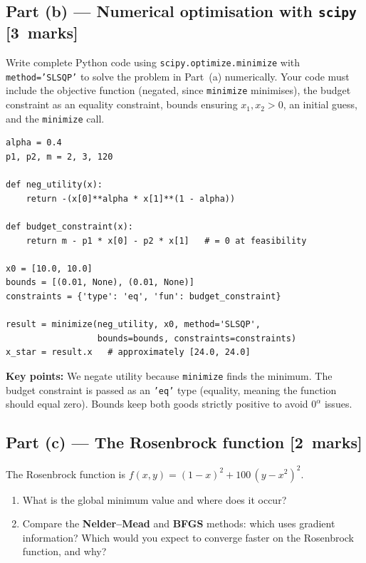 \documentclass[11pt,a4paper]{article}
\newcommand{\mkpts}[1]{\hfill\textbf{[#1~marks]}}
\begin{document}
\subsection*{Part (b) --- Numerical optimisation with \texttt{scipy} \mkpts{3}}

Write complete Python code using \texttt{scipy.optimize.minimize} with \texttt{method='SLSQP'} to solve the problem in Part~(a) numerically.  Your code must include the objective function (negated, since \texttt{minimize} minimises), the budget constraint as an equality constraint, bounds ensuring $x_1, x_2 > 0$, an initial guess, and the \texttt{minimize} call.

\begin{solution}
\begin{lstlisting}[numbers=none]
alpha = 0.4
p1, p2, m = 2, 3, 120

def neg_utility(x):
    return -(x[0]**alpha * x[1]**(1 - alpha))

def budget_constraint(x):
    return m - p1 * x[0] - p2 * x[1]   # = 0 at feasibility

x0 = [10.0, 10.0]
bounds = [(0.01, None), (0.01, None)]
constraints = {'type': 'eq', 'fun': budget_constraint}

result = minimize(neg_utility, x0, method='SLSQP',
                  bounds=bounds, constraints=constraints)
x_star = result.x   # approximately [24.0, 24.0]
\end{lstlisting}

\textbf{Key points:} We negate utility because \texttt{minimize} finds the minimum.  The budget constraint is passed as an \texttt{'eq'} type (equality, meaning the function should equal zero).  Bounds keep both goods strictly positive to avoid $0^{\alpha}$ issues.
\end{solution}

\subsection*{Part (c) --- The Rosenbrock function \mkpts{2}}

The Rosenbrock function is $f(x,y) = (1-x)^2 + 100\,(y-x^2)^2$.

\begin{enumerate}[label=(\roman*),nosep]
\item What is the global minimum value and where does it occur?
\item Compare the \textbf{Nelder--Mead} and \textbf{BFGS} methods: which uses gradient information?  Which would you expect to converge faster on the Rosenbrock function, and why?
\end{enumerate}
\end{document}
